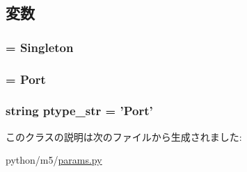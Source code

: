 \subsection{変数}
\hypertarget{classm5_1_1params_1_1PortParamDesc_adfc4d1824f4ecdcbb04ceafc5bbc933e}{
\subsubsection[{\_\-\_\-metaclass\_\-\_\-}]{ = {\bf Singleton}}}
\label{classm5_1_1params_1_1PortParamDesc_adfc4d1824f4ecdcbb04ceafc5bbc933e}
\hypertarget{classm5_1_1params_1_1PortParamDesc_a0916607956575302a93dbd21440edc1a}{
\subsubsection[{ptype}]{ = {\bf Port}}}
\label{classm5_1_1params_1_1PortParamDesc_a0916607956575302a93dbd21440edc1a}
\hypertarget{classm5_1_1params_1_1PortParamDesc_a29e0f56ac0f7569c2c0a3996f05d4b7f}{
\subsubsection[{ptype\_\-str}]{\setlength{\rightskip}{0pt plus 5cm}string {\bf ptype\_\-str} = '{\bf Port}'}}
\label{classm5_1_1params_1_1PortParamDesc_a29e0f56ac0f7569c2c0a3996f05d4b7f}


このクラスの説明は次のファイルから生成されました:\begin{DoxyCompactItemize}
\item 
python/m5/\hyperlink{params_8py}{params.py}\end{DoxyCompactItemize}
